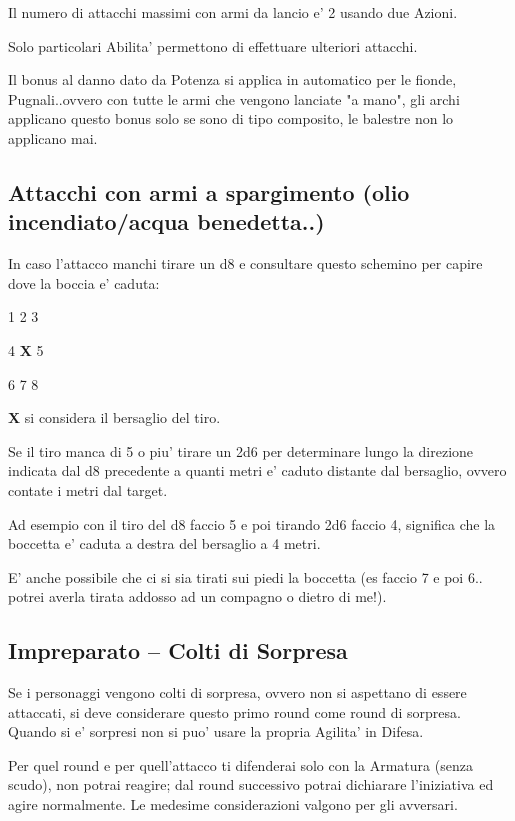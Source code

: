 \documentclass[a4paper,11pt,twoside,openany]{book}
\begin{document}
Il numero di attacchi massimi con armi da lancio e' 2 usando due Azioni.

Solo particolari Abilita' permettono di effettuare ulteriori attacchi.

Il bonus al danno dato da Potenza si applica in automatico per le fionde, Pugnali..ovvero con tutte le armi che vengono lanciate "a mano", gli archi applicano questo bonus solo se sono di tipo composito, le balestre non lo applicano mai.

\subsection{Attacchi con armi a spargimento (olio incendiato/acqua benedetta..)}

In caso l'attacco manchi tirare un d8 e consultare questo schemino per capire dove la boccia e' caduta:

1 2 3

4 \textbf{X} 5

6 7 8

\textbf{X} si considera il bersaglio del tiro.

Se il tiro manca di 5 o piu' tirare un 2d6 per determinare lungo la direzione indicata dal d8 precedente a quanti metri e' caduto distante dal bersaglio, ovvero contate i metri dal target.

Ad esempio con il tiro del d8 faccio 5 e poi tirando 2d6 faccio 4, significa che la boccetta e' caduta a destra del bersaglio a 4 metri.

E' anche possibile che ci si sia tirati sui piedi la boccetta (es faccio 7 e poi 6.. potrei averla tirata addosso ad un compagno o dietro di me!).

\subsection{Impreparato -- Colti di Sorpresa}

Se i personaggi vengono colti di sorpresa, ovvero non si aspettano di essere attaccati, si deve considerare questo primo round come round di sorpresa. Quando si e' sorpresi non si puo' usare la propria Agilita' in Difesa.

Per quel round e per quell'attacco ti difenderai solo con la Armatura (senza scudo), non potrai reagire; dal round successivo potrai dichiarare l'iniziativa ed agire normalmente. Le medesime considerazioni valgono per gli avversari.
\end{document}
